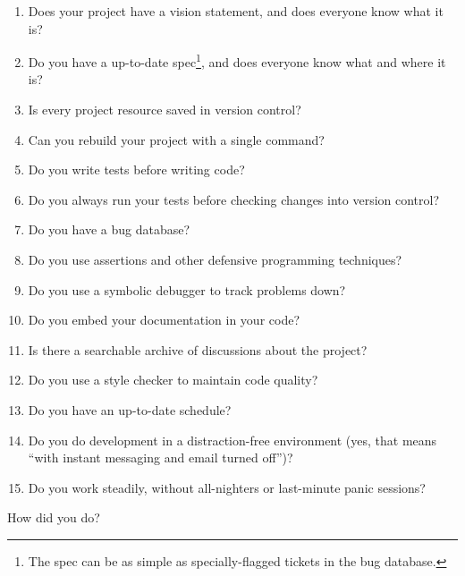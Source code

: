 \documentclass{report}
\begin{document}
\begin{enumerate}

  \item Does your project have a vision statement, and does everyone
  know what it is?

  \item Do you have a up-to-date spec\footnote{The spec can be as
  simple as specially-flagged tickets in the bug database.}, and does
  everyone know what and where it is?

  \item Is every project resource saved in version control?

  \item Can you rebuild your project with a single command?

  \item Do you write tests before writing code?

  \item Do you always run your tests before checking changes into
  version control?

  \item Do you have a bug database?

  \item Do you use assertions and other defensive programming
  techniques?

  \item Do you use a symbolic debugger to track problems down?

  \item Do you embed your documentation in your code?

  \item Is there a searchable archive of discussions about the
  project?

  \item Do you use a style checker to maintain code quality?

  \item Do you have an up-to-date schedule?

  \item Do you do development in a distraction-free environment (yes,
  that means ``with instant messaging and email turned off'')?

  \item Do you work steadily, without all-nighters or last-minute
  panic sessions?

\end{enumerate}

How did you do?
\end{document}
